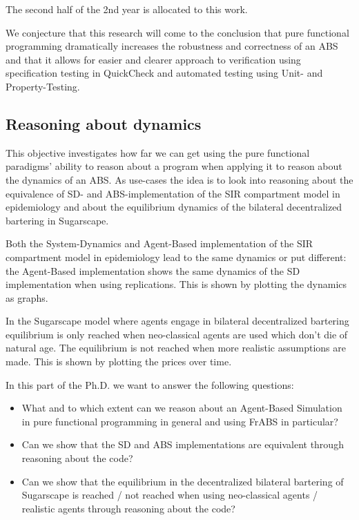 The second half of the 2nd year is allocated to this work.

We conjecture that this research will come to the conclusion that pure functional programming dramatically increases the robustness and correctness of an ABS and that it allows for easier and clearer approach to verification using specification testing in QuickCheck and automated testing using Unit- and Property-Testing.

\subsection{Reasoning about dynamics}
This objective investigates how far we can get using the pure functional paradigms' ability to reason about a program when applying it to reason about the dynamics of an ABS. As use-cases the idea is to look into reasoning about the equivalence of SD- and ABS-implementation of the SIR compartment model in epidemiology and about the equilibrium dynamics of the bilateral decentralized bartering in Sugarscape.

Both the System-Dynamics and Agent-Based implementation of the SIR compartment model in epidemiology lead to the same dynamics or put different: the Agent-Based implementation shows the same dynamics of the SD implementation when using replications. This is shown by plotting the dynamics as graphs. 

In the Sugarscape model where agents engage in bilateral decentralized bartering equilibrium is only reached when neo-classical agents are used which don't die of natural age. The equilibrium is not reached when more realistic assumptions are made. This is shown by plotting the prices over time. 

In this part of the Ph.D. we want to answer the following questions:
\begin{itemize}
	\item What and to which extent can we reason about an Agent-Based Simulation in pure functional programming in general and using FrABS in particular?
	\item Can we show that the SD and ABS implementations are equivalent through reasoning about the code?
	\item Can we show that the equilibrium in the decentralized bilateral bartering of Sugarscape is reached / not reached when using neo-classical agents / realistic agents through reasoning about the code?
\end{itemize}

